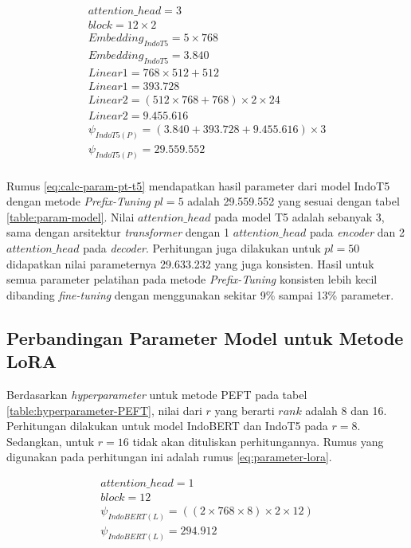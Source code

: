 \begin{equation}
    \begin{aligned}
        attention\_head = 3 \\
        block = 12 \times 2 \\
        Embedding_{IndoT5} = 5 \times 768 \\
        Embedding_{IndoT5} = 3.840 \\
        Linear1 = 768 \times 512 + 512 \\
        Linear1 = 393.728 \\
        Linear2 = (512 \times 768 + 768) \times 2 \times 24 \\
        Linear2 = 9.455.616 \\
        \psi_{IndoT5(P)} = (3.840 + 393.728 + 9.455.616) \times 3 \\
        \psi_{IndoT5(P)} = 29.559.552 \\
    \end{aligned}
    \label{eq:calc-param-pt-t5}
\end{equation}

Rumus \ref{eq:calc-param-pt-t5} mendapatkan hasil parameter dari model IndoT5 dengan metode \textit{Prefix-Tuning} $pl=5$ adalah 29.559.552 yang sesuai dengan tabel \ref{table:param-model}. Nilai $attention\_head$ pada model T5 adalah sebanyak 3, sama dengan arsitektur \textit{transformer} dengan 1 $attention\_head$ pada \textit{encoder} dan 2 $attention\_head$ pada \textit{decoder}. Perhitungan juga dilakukan untuk $pl=50$ didapatkan nilai parameternya 29.633.232 yang juga konsisten. Hasil untuk semua parameter pelatihan pada metode \textit{Prefix-Tuning} konsisten lebih kecil dibanding \textit{fine-tuning} dengan menggunakan sekitar 9\% sampai 13\% parameter.


\subsection{Perbandingan Parameter Model untuk Metode LoRA}

Berdasarkan \textit{hyperparameter} untuk metode PEFT pada tabel \ref{table:hyperparameter-PEFT}, nilai dari $r$ yang berarti $rank$ adalah 8 dan 16. Perhitungan dilakukan untuk model IndoBERT dan IndoT5 pada $r=8$. Sedangkan, untuk $r=16$ tidak akan dituliskan perhitungannya. Rumus yang digunakan pada perhitungan ini adalah rumus \ref{eq:parameter-lora}.

\begin{equation}
    \begin{aligned}
        attention\_head = 1 \\
        block = 12 \\
        \psi_{IndoBERT(L)} = ((2 \times 768 \times 8) \times 2 \times 12) \\
        \psi_{IndoBERT(L)} = 294.912
    \end{aligned}
    \label{eq:calc-param-lora-bert}
\end{equation}

